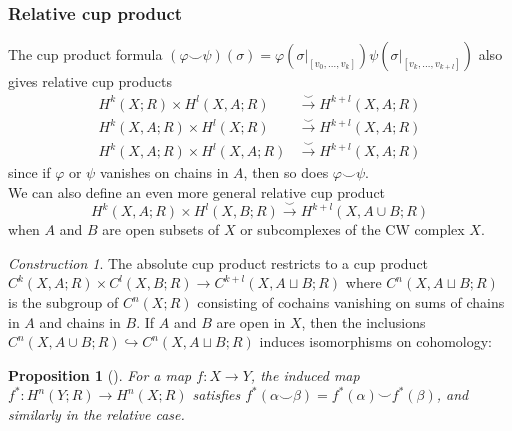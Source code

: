 \documentclass[reqno]{amsart}
\newtheorem{proposition}[theorem]{Proposition}
\theoremstyle{definition}
\theoremstyle{remark}
\newtheorem*{construction}{Construction}
\begin{document}
    \subsubsection{Relative cup product}
    The cup product formula $\left( \varphi \smile
    \psi \right) (\sigma) = 
    \varphi \left( \sigma |_{\left[ v_0, \ldots, v_k \right] 
    }\right) \psi \left( 
    \sigma |_{\left[ v_k, \ldots, v_{k+l} \right] }\right) $ also
    gives relative cup products
    \begin{align*}
        H^{k}(X;R) \times H^{l}(X,A;R)
        &\stackrel{\smile}{\to} H^{k+l}(X,A;R)\\
        H^{k}(X,A;R) \times H^{l}(X;R)
        &\stackrel{\smile}{\to} H^{k+l}(X,A;R)\\
        H^{k}(X,A;R) \times H^{l}(X,A;R)
        &\stackrel{\smile}{\to} H^{k+l}(X,A;R)
    \end{align*}
    since if $\varphi $ or $\psi $ vanishes
    on chains in $A$, then so does
    $\varphi \smile \psi $.\\
    \linebreak
    We can also define an even more general relative cup product
    \[
    H^{k}(X,A;R) \times H^{l}(X,B;R)
    \stackrel{\smile}{\to} H^{k+l}(X, A \cup B;R)
    \] 
    when $A$ and $B$ are open subsets of $X$ or subcomplexes
    of the CW complex $X$.

    \begin{construction}
        The absolute cup product restricts to a cup product
        $C^{k}(X,A;R) \times C^{l}(X,B;R)
        \to C^{k+l}(X,A \sqcup  B; R)$ where
        $C^{n}\left( X,A \sqcup  B;R \right) $ is the subgroup
        of $C^{n}(X;R)$ consisting of cochains vanishing
        on sums of chains in $A$ and chains in $B$.
        If $A$ and $B$ are open in $X$, then
        the inclusions
        $C^{n} (X,A \cup B;R) \hookrightarrow 
        C^{n}(X, A\sqcup B;R)$ induces
        isomorphisms on cohomology:
        
    \end{construction}











    \begin{proposition}[]
        For a map $f \colon X \to Y$, the induced
        map $f^{*} \colon
        H^{n} (Y;R) \to H^{n}(X;R)$ satisfies
        $f^{*}\left( \alpha \smile \beta \right) 
        = f^{*}(\alpha) \smile
        f^{*}(\beta)$, and similarly in the relative
        case.
    \end{proposition}
\end{document}
